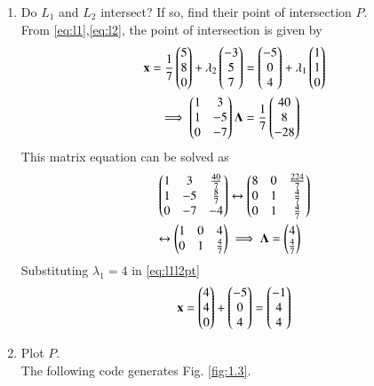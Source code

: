 \begin{enumerate}[label=\arabic*.,ref=\thesubsection.\theenumi]
\item Do $L_1$ and $L_2$ intersect? If so, find their point of intersection $P$.
\\
\solution From \eqref{eq:l1},\eqref{eq:l2}, the point of intersection is given by
\begin{align}
\label{eq:l1l2pt}
\mathbf{x} = \frac{1}{7}\begin{pmatrix} 5 \\ 8 \\ 0\end{pmatrix} + \lambda_2 \begin{pmatrix} -3 \\ 5 \\ 7\end{pmatrix} &= \begin{pmatrix} 
-5 \\ 0 \\ 4\end{pmatrix} + \lambda_1 \begin{pmatrix} 1 \\ 1 \\ 0\end{pmatrix}
\\
\implies 
\begin{pmatrix}1 &  3 \\ 1 & -5 \\ 0 & -7\end{pmatrix}\mathbf{\Lambda} &= \frac{1}{7}\begin{pmatrix}40 \\ 8 \\ -28\end{pmatrix}
\end{align}
This matrix equation can be solved as
\begin{align}
\begin{pmatrix}1 &  3 & \frac{40}{7}\\ 1 & -5 &\frac{8}{7}\\ 0 & -7 & -4\end{pmatrix} &\leftrightarrow \begin{pmatrix}8 &  0 & 
\frac{224}{7}\\ 0 & 1 &\frac{4}{7}\\ 0 & 1 & \frac{4}{7} \end{pmatrix}
\\
\leftrightarrow \begin{pmatrix}1 &  0 & 
4\\ 0 & 1 &\frac{4}{7} \end{pmatrix} &\implies \mathbf{\Lambda} = \begin{pmatrix}4\\\frac{4}{7}\end{pmatrix}
\end{align}
%
Substituting $\lambda_1 = 4$ in \eqref{eq:l1l2pt}
\begin{align}
\mathbf{x} = \begin{pmatrix}4 \\ 4 \\ 0\end{pmatrix} + \begin{pmatrix}-5 \\ 0 \\ 4\end{pmatrix} = \begin{pmatrix}-1\\ 4\\ 4\end{pmatrix}
\end{align}
\item Plot $P$.
\\
\solution The following code generates Fig. \ref{fig:1.3}.
\begin{lstlisting}
 

\end{lstlisting}
\end{enumerate}
